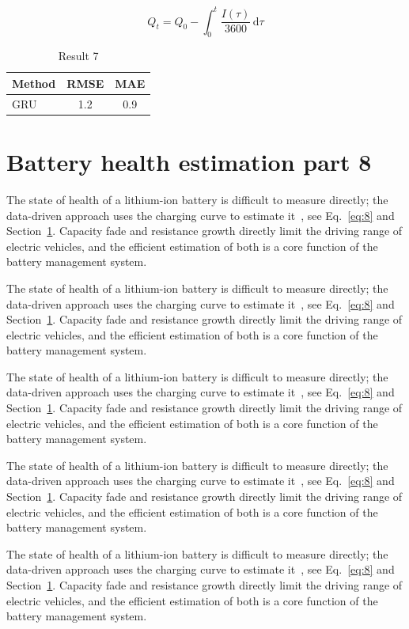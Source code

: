 \documentclass[11pt]{article}
\begin{document}
\begin{equation}\label{eq:7}
  Q_t = Q_0 - \int_0^t \frac{I(\tau)}{3600}\,\mathrm{d}\tau
\end{equation}
\begin{table}[h]\centering\begin{tabular}{lcc}\toprule Method & RMSE & MAE\\\midrule GRU & 1.2 & 0.9\\\bottomrule\end{tabular}\caption{Result 7}\end{table}

\section{Battery health estimation part 8}\label{sec:8}
The state of health of a lithium-ion battery is difficult to measure directly; the data-driven approach uses the charging curve to estimate it~\cite{a2020}, see Eq.~\eqref{eq:8} and Section~\ref{sec:8}. Capacity fade and resistance growth directly limit the driving range of electric vehicles, and the efficient estimation of both is a core function of the battery management system.

The state of health of a lithium-ion battery is difficult to measure directly; the data-driven approach uses the charging curve to estimate it~\cite{a2020}, see Eq.~\eqref{eq:8} and Section~\ref{sec:8}. Capacity fade and resistance growth directly limit the driving range of electric vehicles, and the efficient estimation of both is a core function of the battery management system.

The state of health of a lithium-ion battery is difficult to measure directly; the data-driven approach uses the charging curve to estimate it~\cite{a2020}, see Eq.~\eqref{eq:8} and Section~\ref{sec:8}. Capacity fade and resistance growth directly limit the driving range of electric vehicles, and the efficient estimation of both is a core function of the battery management system.

The state of health of a lithium-ion battery is difficult to measure directly; the data-driven approach uses the charging curve to estimate it~\cite{a2020}, see Eq.~\eqref{eq:8} and Section~\ref{sec:8}. Capacity fade and resistance growth directly limit the driving range of electric vehicles, and the efficient estimation of both is a core function of the battery management system.

The state of health of a lithium-ion battery is difficult to measure directly; the data-driven approach uses the charging curve to estimate it~\cite{a2020}, see Eq.~\eqref{eq:8} and Section~\ref{sec:8}. Capacity fade and resistance growth directly limit the driving range of electric vehicles, and the efficient estimation of both is a core function of the battery management system.
\end{document}
